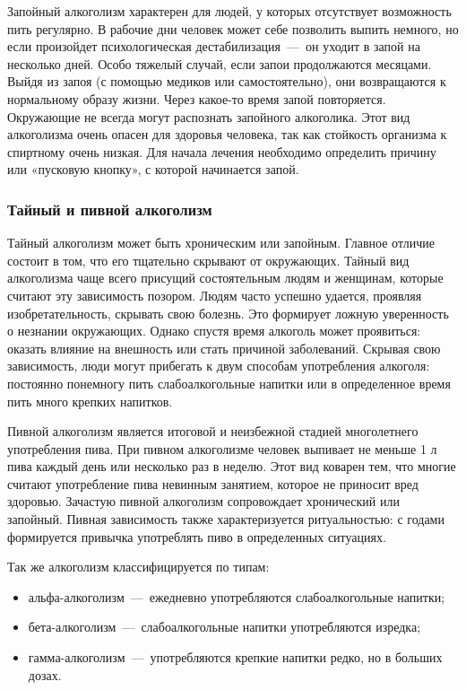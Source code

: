 \documentclass[14pt]{extarticle}
\begin{document}
Запойный алкоголизм характерен для людей, у которых отсутствует возможность пить регулярно. В рабочие дни человек может себе позволить выпить немного, но если произойдет психологическая дестабилизация~---~он уходит в запой на несколько дней. Особо тяжелый случай, если запои продолжаются месяцами. Выйдя из запоя (с помощью медиков или самостоятельно), они возвращаются к нормальному образу жизни. Через какое-то время запой повторяется. Окружающие не всегда могут распознать запойного алкоголика. Этот вид алкоголизма очень опасен для здоровья человека, так как стойкость организма к спиртному очень низкая. Для начала лечения необходимо определить причину или «пусковую кнопку», с которой начинается запой.

\subsubsection*{Тайный и пивной алкоголизм}

Тайный алкоголизм может быть хроническим или запойным. Главное отличие состоит в том, что его тщательно скрывают от окружающих. Тайный вид алкоголизма чаще всего присущий состоятельным людям и женщинам, которые считают эту зависимость позором. Людям часто успешно удается, проявляя изобретательность, скрывать свою болезнь. Это формирует ложную уверенность о незнании окружающих. Однако спустя время алкоголь может проявиться: оказать влияние на внешность или стать причиной заболеваний. Скрывая свою зависимость, люди могут прибегать к двум способам употребления алкоголя: постоянно понемногу пить слабоалкогольные напитки или в определенное время пить много крепких напитков.

Пивной алкоголизм является итоговой и неизбежной стадией многолетнего употребления пива. При пивном алкоголизме человек выпивает не меньше 1 л пива каждый день или несколько раз в неделю. Этот вид коварен тем, что многие считают употребление пива невинным занятием, которое не приносит вред здоровью. Зачастую пивной алкоголизм сопровождает хронический или запойный. Пивная зависимость также характеризуется ритуальностью: с годами формируется привычка употреблять пиво в определенных ситуациях.

Так же алкоголизм классифицируется по типам:

\begin{itemize}
	\item альфа-алкоголизм~---~ежедневно употребляются слабоалкогольные напитки;
	\item бета-алкоголизм~---~слабоалкогольные напитки употребляются изредка;
	\item гамма-алкоголизм~---~употребляются крепкие напитки редко, но в больших дозах.
\end{itemize}
	
\end{document}
